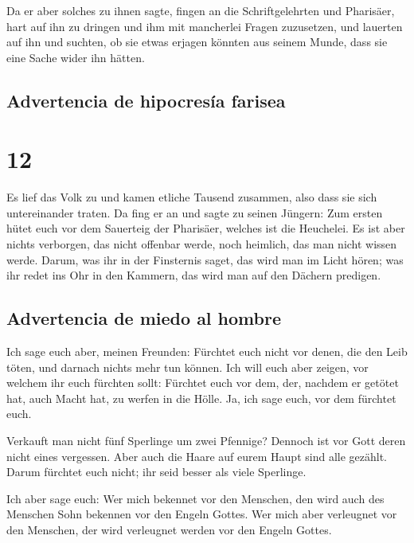  Da er aber solches zu ihnen sagte, fingen an die
Schriftgelehrten und Pharisäer, hart auf ihn zu dringen und ihm mit
mancherlei Fragen zuzusetzen,  und lauerten auf ihn und
suchten, ob sie etwas erjagen könnten aus seinem Munde, dass sie eine
Sache wider ihn hätten.

\hypertarget{advertencia-de-hipocresuxeda-farisea}{%
\subsection{Advertencia de hipocresía
farisea}\label{advertencia-de-hipocresuxeda-farisea}}

\hypertarget{section-11}{%
\section{12}\label{section-11}}

 Es lief das Volk zu und kamen etliche Tausend zusammen,
also dass sie sich untereinander traten. Da fing er an und sagte zu
seinen Jüngern: Zum ersten hütet euch vor dem Sauerteig der Pharisäer,
welches ist die Heuchelei.  Es ist aber nichts verborgen,
das nicht offenbar werde, noch heimlich, das man nicht wissen werde.
 Darum, was ihr in der Finsternis saget, das wird man im
Licht hören; was ihr redet ins Ohr in den Kammern, das wird man auf den
Dächern predigen.

\hypertarget{advertencia-de-miedo-al-hombre}{%
\subsection{Advertencia de miedo al
hombre}\label{advertencia-de-miedo-al-hombre}}

 Ich sage euch aber, meinen Freunden: Fürchtet euch nicht
vor denen, die den Leib töten, und darnach nichts mehr tun können.
 Ich will euch aber zeigen, vor welchem ihr euch fürchten
sollt: Fürchtet euch vor dem, der, nachdem er getötet hat, auch Macht
hat, zu werfen in die Hölle. Ja, ich sage euch, vor dem fürchtet euch.

 Verkauft man nicht fünf Sperlinge um zwei Pfennige?
Dennoch ist vor Gott deren nicht eines vergessen.  Aber
auch die Haare auf eurem Haupt sind alle gezählt. Darum fürchtet euch
nicht; ihr seid besser als viele Sperlinge.

 Ich aber sage euch: Wer mich bekennet vor den Menschen,
den wird auch des Menschen Sohn bekennen vor den Engeln Gottes.
 Wer mich aber verleugnet vor den Menschen, der wird
verleugnet werden vor den Engeln Gottes.

